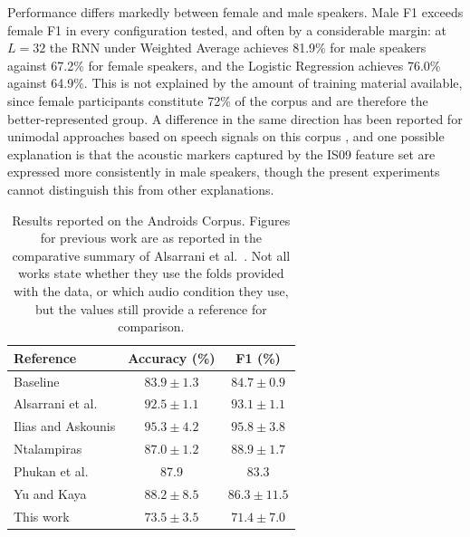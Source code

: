 \documentclass{mproj}
\begin{document}
Performance differs markedly between female and male speakers. Male F1 exceeds female F1 in every configuration tested, and often by a considerable margin: at $L = 32$ the RNN under Weighted Average achieves 81.9\% for male speakers against 67.2\% for female speakers, and the Logistic Regression achieves 76.0\% against 64.9\%. This is not explained by the amount of training material available, since female participants constitute 72\% of the corpus and are therefore the better-represented group. A difference in the same direction has been reported for unimodal approaches based on speech signals on this corpus \cite{alsarrani2025}, and one possible explanation is that the acoustic markers captured by the IS09 feature set are expressed more consistently in male speakers, though the present experiments cannot distinguish this from other explanations.

\begin{table}[htbp]
  \centering
  \caption{Results reported on the Androids Corpus. Figures for previous work
  are as reported in the comparative summary of Alsarrani et al.\
  \cite{alsarrani2025}. Not all
  works state whether they use the folds provided with the data, or which audio
  condition they use, but the values still provide a reference for comparison.}
  \label{tab:published}
  \begin{tabular}{lcc}
    \toprule
    Reference               & Accuracy (\%)   & F1 (\%) \\
    \midrule
    Baseline \cite{tao2023androids}        & $83.9 \pm 1.3$  & $84.7 \pm 0.9$ \\
    Alsarrani et al.\ \cite{alsarrani2025} & $92.5 \pm 1.1$  & $93.1 \pm 1.1$ \\
    Ilias and Askounis \cite{ilias2024} & $95.3 \pm 4.2$  & $95.8 \pm 3.8$ \\
    Ntalampiras \cite{ntalampiras2025}        & $87.0 \pm 1.2$  & $88.9 \pm 1.7$ \\
    Phukan et al.\ \cite{phukan2024}     & 87.9            & 83.3 \\
    Yu and Kaya \cite{yu2025}         & $88.2 \pm 8.5$  & $86.3 \pm 11.5$ \\
    \midrule
    This work               & $73.5 \pm 3.5$  & $71.4 \pm 7.0$ \\
    \bottomrule
  \end{tabular}
\end{table}
\end{document}
